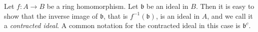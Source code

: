 \documentclass[12pt]{article}
\begin{document}
Let $f: A \to B$ be a ring homomorphism. Let $\mathfrak{b}$ be an ideal in $B$. Then it is easy to show that the inverse image of $\mathfrak{b}$, that is $f^{-1}(\mathfrak{b})$, is an ideal in $A$, and we call it a {\em contracted ideal}. A common notation for the contracted ideal in this case is $\mathfrak{b}^c$.
\end{document}
